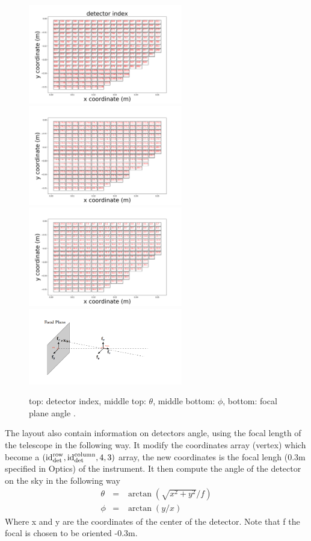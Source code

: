 \documentclass[a4paper, 11pt]{article}
\def\ba{\begin{eqnarray}}
\def\ea{\end{eqnarray}}
\begin{document}
\begin{figure}
  \centering
  \includegraphics[width=0.6\textwidth]{det_index.png}
    \includegraphics[width=0.6\textwidth]{theta.png}
  \includegraphics[width=0.6\textwidth]{phi.png}
    \includegraphics[width=0.6\textwidth]{focal_plane.png}
  \caption{top: detector index, middle top: $\theta$, middle bottom: $\phi$, bottom: focal plane angle .}
  \label{fig:detector_array}
\end{figure}

The layout also contain information on detectors angle, using the focal length of the telescope in the following way. It modify the coordinates array (vertex) which become a $({\rm id}^{\rm row}_{\rm det},{\rm id}^{\rm column}_{\rm det} ,4,3)$  array, the new coordinates is the focal lengh (0.3m specified in Optics) of the instrument. 
It then compute the angle of the detector on the sky in the following way
\ba
\theta &=& \arctan ( \sqrt{x^{2}+y^{2}} / f) \\
\phi &=& \arctan ( y/x )
\ea
Where x and y are the coordinates of the center of the detector.
Note that f the focal is chosen to be oriented -0.3m.
\end{document}
